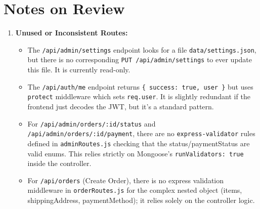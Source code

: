 \documentclass[12pt,a4paper]{article}
\begin{document}
\section{Notes on Review}
\begin{enumerate}
    \item \textbf{Unused or Inconsistent Routes:}
    \begin{itemize}
        \item The \texttt{/api/admin/settings} endpoint looks for a file \texttt{data/settings.json}, but there is no corresponding \texttt{PUT /api/admin/settings} to ever update this file. It is currently read-only.
        \item The \texttt{/api/auth/me} endpoint returns \texttt{\{ success: true, user \}} but uses \texttt{protect} middleware which sets \texttt{req.user}. It is slightly redundant if the frontend just decodes the JWT, but it's a standard pattern.
        \item For \texttt{/api/admin/orders/:id/status} and \texttt{/api/admin/orders/:id/payment}, there are no \texttt{express-validator} rules defined in \texttt{adminRoutes.js} checking that the status/paymentStatus are valid enums. This relies strictly on Mongoose's \texttt{runValidators: true} inside the controller.
        \item For \texttt{/api/orders} (Create Order), there is no express validation middleware in \texttt{orderRoutes.js} for the complex nested object (items, shippingAddress, paymentMethod); it relies solely on the controller logic.
    \end{itemize}
\end{enumerate}
\end{document}
